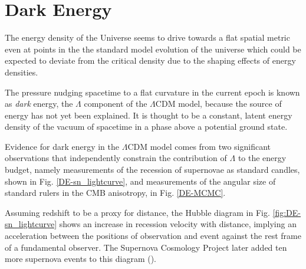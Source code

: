 \documentclass{paper}
\begin{document}

\section*{Dark Energy}
  The energy density of the Universe seems to drive towards
  a flat spatial metric even at points in the
  the standard model evolution of the universe which could be expected
  to deviate from the critical density due to the shaping effects of 
  energy densities.

  The pressure nudging spacetime to a flat curvature in the current epoch is 
  known as \textit{dark} energy, the $\Lambda$ component of the $\Lambda$CDM
  model, because the source of energy has not yet been explained. 
  It is thought to be a constant, latent energy density of the vacuum of 
  spacetime in a phase above a potential ground state.

  Evidence for dark energy in the $\Lambda$CDM model comes from two 
  significant observations that independently constrain the contribution of 
  $\Lambda$ to the energy budget, namely measurements of the recession of 
  supernovae as standard candles, shown in Fig. \ref{DE-sn_lightcurve}, and 
  measurements of the angular size of 
  standard rulers in the CMB anisotropy, in Fig. \ref{DE-MCMC}.

  Assuming redshift to be a proxy for
  distance, the Hubble diagram in Fig. \ref{fig:DE-sn_lightcurve} shows an 
  increase in recession 
  velocity with distance, implying an acceleration between
  the positions of observation and event against the rest frame of a
  fundamental observer. The Supernova Cosmology Project later
  added ten more supernova events to this diagram 
  (\cite{2012ApJ...746...85S}).
\end{document}
